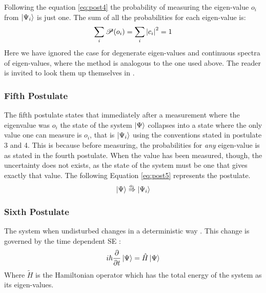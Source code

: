 \documentclass[../master_thesis.tex]{subfiles}
\begin{document}
Following the equation \ref{eq:post4} the probability of measuring the
eigen-value $o_i$ from $\ket{\Psi_i}$ is just one. The sum of all the probabilities
for each eigen-value is:
\begin{equation}
  \sum_i\mathscr{P}(o_i) = \sum_i \abs{c_i}^2 = 1
\end{equation}
Here we have ignored the case for degenerate eigen-values and continuous spectra of
eigen-values, where the method is analogous to the one used above. The reader is
invited to look them up themselves in \cite{Cohen:1973, Atkins:2011}.

\subsubsection{Fifth Postulate}
The fifth postulate states that immediately after a measurement where the eigenvalue was $o_i$
the state of the system $\ket{\Psi}$ collapses into a state where the only value one
can measure is $o_i$, that is $ \ket{\Psi_i} $ using the conventions stated in postulate 3 and 4.
This is because before measuring, the probabilities for \textit{any} eigen-value
is as stated in the fourth postulate. When the value has been measured, though,
the uncertainty does not exists, as the state of the system must be one that gives
exactly that value. The following Equation \ref{eq:post5} represents the postulate.
\begin{equation}\label{eq:post5}
  \ket{\Psi} \stackrel{o_i}{\Rightarrow} \ket{\Psi_i}
\end{equation}

\subsubsection{Sixth Postulate}
The system when undisturbed changes in a deterministic way \cite{Cohen:1973}.
This change is governed by the time dependent \ac{SE} \cite{Cohen:1973, Atkins:2011}:
\begin{equation}\label{eq:tdepSE}
  i\hbar\frac{\partial}{\partial t} \ket{\Psi} = \hat{H}\ket{\Psi}
\end{equation}
Where $\tilde{H}$ is the Hamiltonian operator which has the total energy of the
system as its eigen-values.
\end{document}
